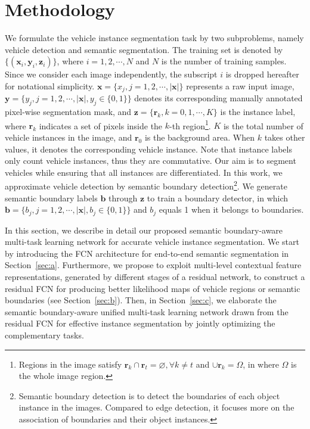\documentclass[journal]{IEEEtran}
\begin{document}
\section{Methodology}
\label{sec:method}
We formulate the vehicle instance segmentation task by two subproblems, namely vehicle detection and semantic segmentation. The training set is denoted by $\{(\bm{x}_i,\bm{y}_i,\bm{z}_i)\}$, where $i=1,2,\cdots,N$ and $N$ is the number of training samples. Since we consider each image independently, the subscript $i$ is dropped hereafter for notational simplicity. $\bm{x}=\{x_j,j=1,2,\cdots,|\bm{x}|\}$ represents a raw input image, $\bm{y}=\{y_j,j=1,2,\cdots,|\bm{x}|,y_j\in\{0,1\}\}$ denotes its corresponding manually annotated pixel-wise segmentation mask, and $\bm{z}=\{\bm{r}_k,k=0,1,\cdots,K\}$ is the instance label, where $\bm{r}_k$ indicates a set of pixels inside the $k$-th region\footnote{Regions in the image satisfy $\bm{r}_k\cap\bm{r}_t=\varnothing,\forall k\neq t$ and $\cup \bm{r}_k=\Omega$, in where $\Omega$ is the whole image region.}. $K$ is the total number of vehicle instances in the image, and $\bm{r}_0$ is the background area. When $k$ takes other values, it denotes the corresponding vehicle instance. Note that instance labels only count vehicle instances, thus they are commutative. Our aim is to segment vehicles while ensuring that all instances are differentiated. In this work, we approximate vehicle detection by semantic boundary detection\footnote{Semantic boundary detection is to detect the boundaries of each object instance in the images. Compared to edge detection, it focuses more on the association of boundaries and their object instances.}. We generate semantic boundary labels $\bm{b}$ through $\bm{z}$ to train a boundary detector, in which $\bm{b}=\{b_j,j=1,2,\cdots,|\bm{x}|,b_j\in\{0,1\}\}$ and $b_j$ equals 1 when it belongs to boundaries.
\par
In this section, we describe in detail our proposed semantic boundary-aware multi-task learning network for accurate vehicle instance segmentation. We start by introducing the FCN architecture for end-to-end semantic segmentation in Section~\ref{sec:a}. Furthermore, we propose to exploit multi-level contextual feature representations, generated by different stages of a residual network, to construct a residual FCN for producing better likelihood maps of vehicle regions or semantic boundaries (see Section~\ref{sec:b}). Then, in Section~\ref{sec:c}, we elaborate the semantic boundary-aware unified multi-task learning network drawn from the residual FCN for effective instance segmentation by jointly optimizing the complementary tasks.
\end{document}
